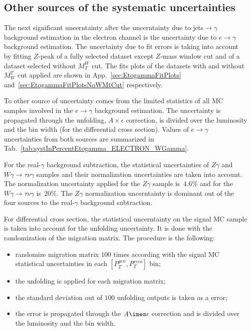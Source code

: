 \subsection{Other sources of the systematic uncertainties}


The next significant uncerntainty after the uncerntainty due to jets$\rightarrow\gamma$ background estimation in the electron channel is the uncertainty due to $e\rightarrow\gamma$ background estimation. The uncertainty due to fit errors is taking into account by fitting $Z$-peak of a fully selected dataset except $Z$-mass window cut and of a dataset selected without $M_T^W$ cut. The fits plots of the datasets with and without $M_W^T$ cut applied are shown in App.~\ref{sec:EtogammaFitPlots} and~\ref{sec:EtogammaFitPlotsNoWMtCut} respectively.

To other source of uncertainty comes from the limited statistics of all MC samples involved in the $e\rightarrow\gamma$ background estimation. The uncertainty is propagated through the unfolding, $A \times \epsilon$ correction, is divided over the luminosity and the bin width (for the differential cross section). Values of $e\rightarrow\gamma$ uncertainties from both sources are summarized in Tab.~\ref{tab:systInPercentEtogamma_ELECTRON_WGamma}.


For the real-$\gamma$ background subtraction, the statistical uncertainties of $Z\gamma$ and $W\gamma\rightarrow\tau\nu\gamma$ samples and their normalization uncertainties are taken into account. The normalization uncertainty applied for the $Z\gamma$ sample is~$4.6\%$ and for the $W\gamma\rightarrow\tau\nu\gamma$ is~$20\%$. The $Z\gamma$ normalization uncerntainty is dominant out of the four sources to the real-$\gamma$ background subtraction.


For differential cross section, the statistical uncerntainty on the signal MC sample is taken into account for the unfolding uncertainty. It is done with the randomization of the migration matrix. The procedure is the following:
\begin{itemize}
  \item randomize migration matrix $100$ times according with the signal MC statistical uncertainties in each $[P_T^{gen},P_T^{reco}]$ bin;
  \item the unfolding is applied for each migration matrix;
  \item the standard deviation out of $100$ unfolding outputs is taken as a error;
  \item the error is propagated through the $A\imes\epsilon$ correction and is divided over the luminosity and the bin width.
\end{itemize}

